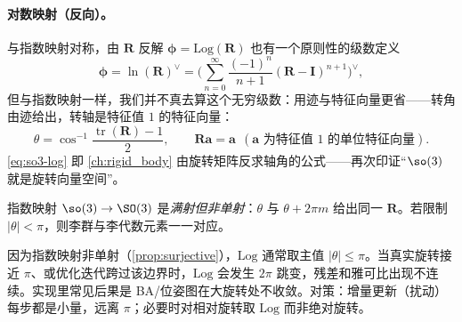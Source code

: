 \paragraph{对数映射（反向）。}与指数映射对称，由 $\mathbf{R}$ 反解 $\boldsymbol{\phi}=\mathrm{Log}(\mathbf{R})$ 也有一个原则性的级数定义\cite{gaoxiang2019slam14}
\begin{equation}
  \boldsymbol{\phi}=\ln(\mathbf{R})^\vee=\Big(\sum_{n=0}^{\infty}\frac{(-1)^n}{n+1}(\mathbf{R}-\mathbf{I})^{n+1}\Big)^{\!\vee},
  \label{eq:so3-log-series}
\end{equation}
但与指数映射一样，我们并不真去算这个无穷级数：用迹与特征向量更省——转角由迹给出，转轴是特征值 $1$ 的特征向量：
\begin{equation}
  \theta=\cos^{-1}\!\frac{\operatorname{tr}(\mathbf{R})-1}{2},\qquad \mathbf{R}\mathbf{a}=\mathbf{a}\ \ (\mathbf{a}\text{ 为特征值 }1\text{ 的单位特征向量}).
  \label{eq:so3-log}
\end{equation}
\cref{eq:so3-log} 即 \cref{ch:rigid_body} 由旋转矩阵反求轴角的公式——再次印证“$\so(3)$ 就是旋转向量空间”。

\begin{proposition}[满射非单射]\label{prop:surjective}
指数映射 $\so(3)\to\SO(3)$ 是\emph{满射但非单射}：$\theta$ 与 $\theta+2\pi m$ 给出同一 $\mathbf{R}$。若限制 $|\theta|<\pi$，则李群与李代数元素一一对应。
\end{proposition}

\begin{pitfall}
因为指数映射非单射（\cref{prop:surjective}），$\mathrm{Log}$ 通常取主值 $|\theta|\le\pi$。当真实旋转接近 $\pi$、或优化迭代跨过该边界时，$\mathrm{Log}$ 会发生 $2\pi$ 跳变，残差和雅可比出现不连续。实现里常见后果是 BA/位姿图在大旋转处不收敛。对策：增量更新（扰动）每步都是小量，远离 $\pi$；必要时对相对旋转取 $\mathrm{Log}$ 而非绝对旋转。
\end{pitfall}

